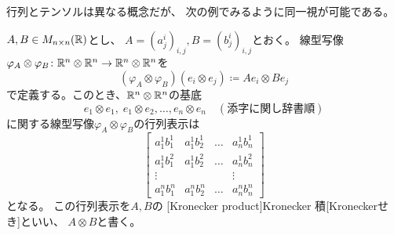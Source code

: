 \documentclass[report]{jlreq}
\begin{document}
行列とテンソルは異なる概念だが、
次の例でみるように同一視が可能である。


\begin{definition}
    $A, B \in M_{n \times n}(\mathbb{R})$とし、
    $A = (a^i_j)_{i,j}, B = (b^i_j)_{i,j}$とおく。
    線型写像$\varphi_A \otimes \varphi_B \colon \mathbb{R}^n \otimes \mathbb{R}^n \to \mathbb{R}^n \otimes \mathbb{R}^n$を
    \begin{equation}
        (\varphi_A \otimes \varphi_B)(e_i \otimes e_j)
            \coloneqq A e_i \otimes B e_j
    \end{equation}
    で定義する。このとき、$\mathbb{R}^n \otimes \mathbb{R}^n$の基底
    \begin{equation}
        e_1 \otimes e_1, \; e_1 \otimes e_2, \dots, e_n \otimes e_n
        \quad (\text{添字に関し辞書順})
    \end{equation}
    に関する線型写像$\varphi_A \otimes \varphi_B$の行列表示は
    \begin{equation}
        \begin{bmatrix}
            a^1_1 b^1_1 & a^1_1 b^1_2 & \dots & a^1_n b^1_n \\
            a^1_1 b^2_1 & a^1_1 b^2_2 & \dots & a^1_n b^2_n \\
            \vdots &&& \vdots \\
            a^n_1 b^n_1 & a^n_1 b^n_2 & \dots & a^n_n b^n_n
        \end{bmatrix}
    \end{equation}
    となる。
    この行列表示を$A, B$の
    [Kronecker product]{Kronecker 積}[Kroneckerせき]といい、
    $A \otimes B$と書く。
\end{definition}
\end{document}
